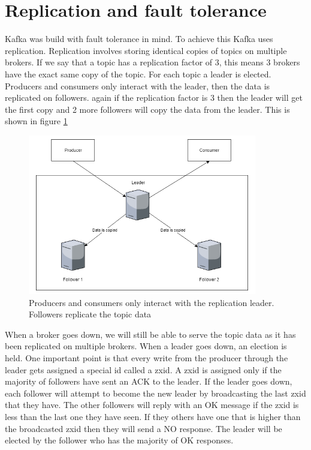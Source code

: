 \section{Replication and fault tolerance}

Kafka was build with fault tolerance in mind. To achieve this Kafka uses replication. Replication involves storing identical copies of topics on multiple brokers. If we say that a topic has a replication factor of 3, this means 3 brokers have the exact same copy of the topic. For each topic a leader is elected. Producers and consumers only interact with the leader, then the data is replicated on followers. again if the replication factor is 3 then the leader will get the first copy and 2 more followers will copy the data from the leader. This is shown in figure \ref{fig:replication-leader}

\begin{figure}[H]
  \centering
  \includegraphics[scale=0.5,width=100mm]{./images/replication-leader.png}
  \caption{Producers and consumers only interact with the replication leader. Followers replicate the topic data}
  \label{fig:replication-leader}
\end{figure}

When a broker goes down, we will still be able to serve the topic data as it has been replicated on multiple brokers. When a leader goes down, an election is held. One important point is that every write from the producer through the leader gets assigned a special id called a zxid. A zxid is assigned only if the majority of followers have sent an ACK to the leader. If the leader goes down, each follower will attempt to become the new leader by broadcasting the last zxid that they have. The other followers will reply with an OK message if the zxid is less than the last one they have seen. If they others have one that is higher than the broadcasted zxid then they will send a NO response. The leader will be elected by the follower who has the majority of OK responses. 